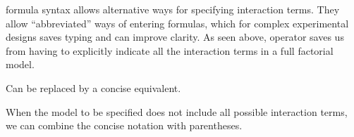 \documentclass[krantz2]{krantz}\usepackage{knitr}
\begin{document}
\begin{knitrout}\footnotesize
{}\color{fgcolor}\begin{kframe}
\begin{alltt}
 \hlopt{~}  \hlopt{+} 
 \hlopt{~}  \hlopt{+} 
\end{alltt}
\end{kframe}
\end{knitrout}

\Rlang formula syntax allows alternative ways for specifying interaction terms. They allow ``abbreviated'' ways of entering formulas, which for complex experimental designs saves typing and can improve clarity. As seen above, operator \code{*} saves us from having to explicitly indicate all the interaction terms in a full factorial model.

\begin{knitrout}\footnotesize
{}\color{fgcolor}\begin{kframe}
\begin{alltt}
 \hlopt{~}  \hlopt{+}  \hlopt{+}  \hlopt{+} \hlopt{:} \hlopt{+} \hlopt{:} \hlopt{+} \hlopt{:} \hlopt{+} \hlopt{:}\hlopt{:}
\end{alltt}
\end{kframe}
\end{knitrout}

Can be replaced by a concise equivalent.

\begin{knitrout}\footnotesize
{}\color{fgcolor}\begin{kframe}
\begin{alltt}
 \hlopt{~}  \hlopt{*}  \hlopt{*} 
\end{alltt}
\end{kframe}
\end{knitrout}

When the model to be specified does not include all possible interaction terms, we can combine the concise notation with parentheses.

\begin{knitrout}\footnotesize
{}\color{fgcolor}\begin{kframe}
\begin{alltt}
 \hlopt{~}  \hlopt{+}  \hlopt{*} 
 \hlopt{~}  \hlopt{+}  \hlopt{+}  \hlopt{+} \hlopt{:}
\end{alltt}
\end{kframe}
\end{knitrout}
\end{document}
